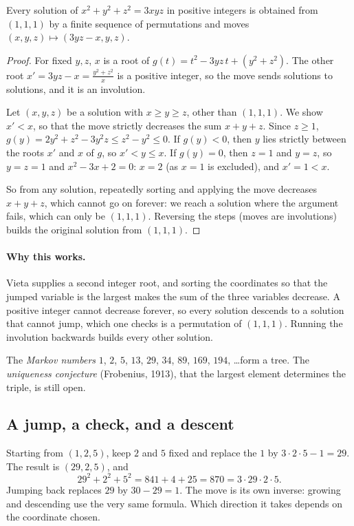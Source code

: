 \begin{theorem}[Markov, 1879]\label{thm:markov}
Every solution of $x^2+y^2+z^2=3xyz$ in positive integers is obtained from $(1,1,1)$ by a finite sequence of permutations and moves $(x,y,z)\mapsto(3yz-x,y,z)$.
\end{theorem}
\begin{proof}
For fixed $y,z$, $x$ is a root of $g(t)=t^2-3yz\,t+(y^2+z^2)$. The other root $x'=3yz-x=\frac{y^2+z^2}x$ is a positive integer, so the move sends solutions to solutions, and it is an involution.

Let $(x,y,z)$ be a solution with $x\ge y\ge z$, other than $(1,1,1)$. We show $x'<x$, so that the move strictly decreases the sum $x+y+z$. Since $z\ge1$, $g(y)=2y^2+z^2-3y^2z\le z^2-y^2\le0$. If $g(y)<0$, then $y$ lies strictly between the roots $x'$ and $x$ of $g$, so $x'<y\le x$. If $g(y)=0$, then $z=1$ and $y=z$, so $y=z=1$ and $x^2-3x+2=0$: $x=2$ (as $x=1$ is excluded), and $x'=1<x$.

So from any solution, repeatedly sorting and applying the move decreases $x+y+z$, which cannot go on forever: we reach a solution where the argument fails, which can only be $(1,1,1)$. Reversing the steps (moves are involutions) builds the original solution from $(1,1,1)$.
\end{proof}

\paragraph{Why this works.}
Vieta supplies a second integer root, and sorting the coordinates so that the jumped variable is the largest makes the sum of the three variables decrease. A positive integer cannot decrease forever, so every solution descends to a solution that cannot jump, which one checks is a permutation of $(1,1,1)$. Running the involution backwards builds every other solution.

The \emph{Markov numbers} $1$, $2$, $5$, $13$, $29$, $34$, $89$, $169$, $194$, \dots form a tree. The \emph{uniqueness conjecture} (Frobenius, 1913), that the largest element determines the triple, is still open.

\subsection*{A jump, a check, and a descent}
Starting from $(1,2,5)$, keep $2$ and $5$ fixed and replace the $1$ by $3\cdot2\cdot5-1=29$. The result is $(29,2,5)$, and
\[
29^2+2^2+5^2=841+4+25=870=3\cdot29\cdot2\cdot5.
\]
Jumping back replaces $29$ by $30-29=1$. The move is its own inverse: growing and descending use the very same formula. Which direction it takes depends on the coordinate chosen.

